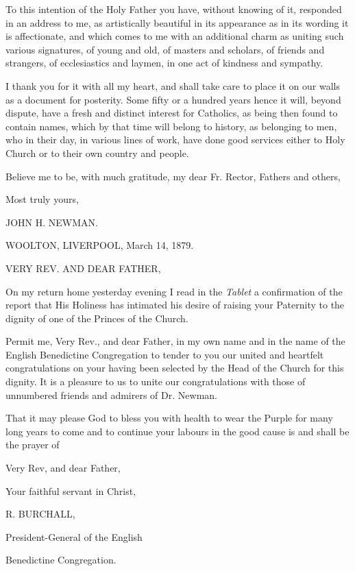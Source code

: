 To this intention of the Holy Father you have, without knowing of
it, responded in an address to me, as artistically beautiful in its
appearance as in its wording it is affectionate, and which comes to me
with an additional charm as uniting such various signatures, of young
and old, of masters and scholars, of friends and strangers, of
ecclesiastics and laymen, in one act of kindness and sympathy.

I thank you for it with all my heart, and shall take care to place
it on our walls as a document for posterity. Some fifty or a hundred
years hence it will, beyond dispute, have a fresh and distinct
interest for Catholics, as being then found to contain names, which by
that time will belong to history, as belonging to men, who in their
day, in various lines of work, have done good services either to Holy
Church or to their own country and people.

Believe me to be, with much gratitude, my dear Fr. Rector, Fathers
and others,

Most truly yours,

JOHN H. NEWMAN.


WOOLTON, LIVERPOOL,
March 14, 1879.

VERY REV. AND
DEAR FATHER,

On my return home yesterday evening I read in the \emph{Tablet} a
confirmation of the report that His Holiness has intimated his desire
of raising your Paternity to the dignity of one of the Princes of the
Church.

Permit me, Very Rev., and dear Father, in my own name and in
the name of the English Benedictine Congregation to tender to you our
united and heartfelt congratulations on your having been selected by
the Head of the Church for this dignity. It is a pleasure to us to
unite our congratulations with those of unnumbered friends and
admirers of Dr. Newman.

That it may please God to bless you with health to wear the Purple
for many long years to come and to continue your labours in the good
cause is and shall be the prayer of

Very Rev, and dear Father,

Your faithful servant in Christ,

R. BURCHALL,

President-General of the English

Benedictine Congregation.

